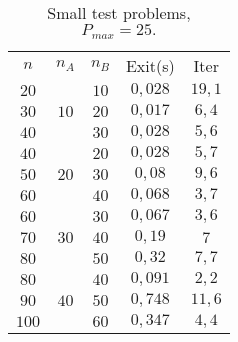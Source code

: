 \documentclass[opre,nonblindrev]{informs3} %
\begin{document}
\begin{table}[h]\scriptsize
	\begin{center}
		\begin{tabular}{|| c |c | c|| c||c ||}\hline
			
			\multirow{3}{*}{$n$} & \multirow{3}{*}{$n_A$} & \multirow{3}{*}{$n_B$} & \multirow{3}{*}{Exit(s)} & \multirow{3}{*}{Iter}\\
			&  &&  & \\
			&    &    &  &\\\hline
			$20$	 & \multirow{3}{*}{$10$}   & $10$   &$0,028$  & $19,1$
			\\
			$30$  &  & $20$	 & $0,017$
			&$6,4$
			\\ 
			$40$  &  & $30$	 & $0,028$
			&$5,6$
			\\ \hline
			
			$40$	 & \multirow{3}{*}{$20$}   & $20$   & $0,028$
			& $5,7$
			\\
			$50$  &  & $30$	 &$0,08$
			&$9,6$
			\\ 
			$60$  &  & $40$	 &$0,068$ &$3,7$\\ \hline
			
			$60$	 & \multirow{3}{*}{$30$}   & $30$   &  $0,067$
			& $3,6$
			\\
			$70$  &  & $40$	 &$0,19$
			&$7$
			\\ 
			$80$  &  & $50$	 & $0,32$
			&$7,7$
			\\ \hline
			
			$80$	 & \multirow{3}{*}{$40$}   & $40$   &  $0,091$
			&$2,2$
			\\
			$90$  &  & $50$	 & $0,748$
			&$11,6$
			\\ 
			$100$  &  & $60$	 & $0,347$
			&$4,4$
			\\ \hline 
		\end{tabular}
	\end{center}
	\caption{Small test problems, $P_{max}= 25.$} \label{smallBid}
\end{table}
\end{document}
